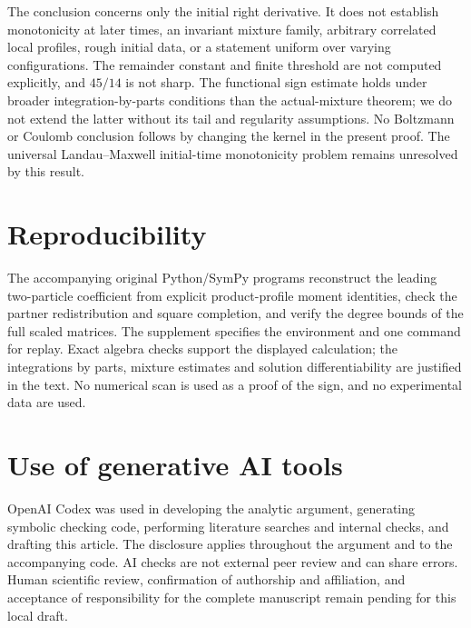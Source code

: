 \documentclass[11pt]{article}
\numberwithin{equation}{section}
\begin{document}
The conclusion concerns only the initial right derivative. It does not
establish monotonicity at later times, an invariant mixture family,
arbitrary correlated local profiles, rough initial data, or a statement
uniform over varying configurations. The remainder constant and finite
threshold are not computed explicitly, and \(45/14\) is not sharp.
The functional sign estimate holds under broader integration-by-parts
conditions than the actual-mixture theorem; we do not extend the latter
without its tail and regularity assumptions. No Boltzmann or Coulomb
conclusion follows by changing the kernel in the present proof. The
universal Landau--Maxwell initial-time monotonicity problem remains
unresolved by this result.

\section*{Reproducibility}
The accompanying original Python/SymPy programs reconstruct the leading
two-particle coefficient from explicit product-profile moment identities,
check the partner redistribution and square completion, and verify the
degree bounds of the full scaled matrices. The supplement specifies the
environment and one command for replay. Exact algebra checks support the
displayed calculation; the integrations by parts, mixture estimates and
solution differentiability are justified in the text. No numerical scan
is used as a proof of the sign, and no experimental data are used.

\section*{Use of generative AI tools}
OpenAI Codex was used in developing the analytic argument, generating
symbolic checking code, performing literature searches and internal
checks, and drafting this article. The disclosure applies throughout
the argument and to the accompanying code. AI checks are not external
peer review and can share errors. Human scientific review, confirmation
of authorship and affiliation, and acceptance of responsibility for the
complete manuscript remain pending for this local draft.



\end{document}
